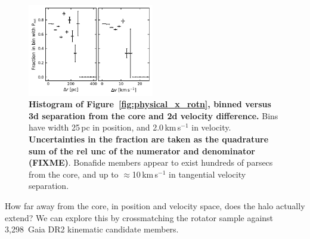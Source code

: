 \documentclass[12pt,twocolumn,tighten]{aastex63}
\newcommand{\nkinematic}{3{,}298\ } %
\begin{document}
\begin{figure}[t]
	\begin{center}
			\includegraphics[width=0.49\textwidth]{f8b.pdf}
	\end{center}
	\vspace{-0.7cm}
  \caption{ {\bf Histogram of Figure~\ref{fig:physical_x_rotn}, binned
  versus 3d separation from the core and 2d velocity difference.} Bins have width
  25\,pc in position, and 2.0\,km\,s$^{-1}$ in velocity.
  {\bf Uncertainties in the fraction are taken as the quadrature sum of
  the rel unc of the numerator and denominator (FIXME)}.
  Bonafide members appear to exist hundreds of parsecs from the core, and
  up to $\approx$10\,km\,s$^{-1}$ in tangential velocity separation.
  \label{fig:hist_physical_x_rotn}
	}
\end{figure}


%	

How far away from the core, in position and velocity space, does the
halo actually extend?  We can explore this by crossmatching the
rotator sample against \nkinematic Gaia DR2 kinematic candidate
members.  
\end{document}
